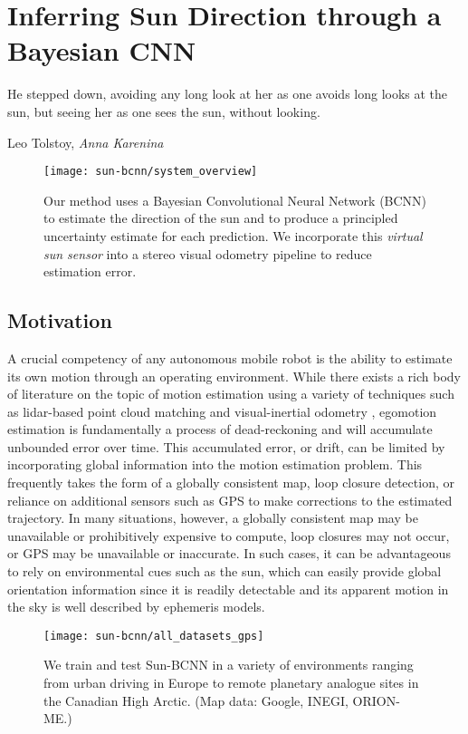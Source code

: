 \chapter{Inferring Sun Direction through a Bayesian CNN}
\epigraph{He stepped down, avoiding any long look at her as one avoids long looks at the sun, but seeing her as one sees the sun, without looking.}{Leo Tolstoy, \textit{Anna Karenina}}
\label{ch:sun-bcnn}

\begin{wrapfigure}{r}{0.5\textwidth}
    \centering
      \texttt{[image: sun-bcnn/system\_overview]}
      \caption{Our method uses a Bayesian Convolutional Neural Network (BCNN) to estimate the direction of the sun and to produce a principled uncertainty estimate for each prediction. We incorporate this \emph{virtual sun sensor} into a stereo visual odometry pipeline to reduce estimation error.}
    \label{fig:sun-bcnn_system}
\end{wrapfigure}

\section{Motivation}
A crucial competency of any autonomous mobile robot is the ability to estimate its own motion through an operating environment.
While there exists a rich body of literature on the topic of motion estimation using a variety of techniques such as lidar-based point cloud matching \citep{Zhang2015} and visual-inertial odometry \citep{Leutenegger2015-fk}, egomotion estimation is fundamentally a process of dead-reckoning and will accumulate unbounded error over time.
This accumulated error, or drift, can be limited by incorporating global information into the motion estimation problem.
This frequently takes the form of a globally consistent map, loop closure detection, or reliance on additional sensors such as GPS to make corrections to the estimated trajectory.
In many situations, however, a globally consistent map may be unavailable or prohibitively expensive to compute, loop closures may not occur, or GPS may be unavailable or inaccurate.
In such cases, it can be advantageous to rely on environmental cues such as the sun, which can easily provide global orientation information since it is readily detectable and its apparent motion in the sky is well described by ephemeris models.


\begin{figure}
    \centering
    \texttt{[image: sun-bcnn/all\_datasets\_gps]}
    \caption{We train and test Sun-BCNN in a variety of environments ranging from urban driving in Europe to remote planetary analogue sites in the Canadian High Arctic. (Map data: Google, INEGI, ORION-ME.)}
    \label{fig:sun-bcnn_global-gps}
\end{figure}

